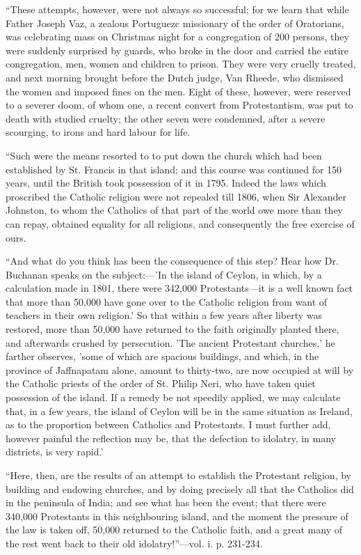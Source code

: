 ``These
attempts, however, were not always so successful; for we learn that
while Father Joseph Vaz, a zealous Portuguezc missionary of the order of
Oratorians, was celebrating mass on Christmas night for a congregation
of 200 persons, they were suddenly surprised by guards, who broke in the
door and carried the entire congregation, men, women and children to
prison. They were very cruelly treated, and next morning brought before
the Dutch judge, Van Rheede, who dismissed the women and imposed fines
on the men. Eight of these, however, were reserved to a severer doom, of
whom one, a recent convert from Protestantism, was put to death with
studied cruelty; the other seven were condemned, after a severe
scourging, to irons and hard labour for life.

``Such
were the means resorted to to put down the church which had been
established by St. Francis in that island; and this course was continued
for 150 years, until the British took possession of it in 1795. Indeed
the laws which proscribed the Catholic religion were not repealed till
1806, when Sir Alexander Johnston, to whom the Catholics of that part of
the world owe more than they can repay, obtained equality for all
religions, and consequently the free exercise of ours.

``And
what do you think has been the consequence of this step? Hear how Dr.
Buchanan speaks on the subject:—'In the island of Ceylon, in which, by
a calculation made in 1801, there were 342,000 Protestants—it is a
well known fact that more than 50,000 have gone over
to the Catholic religion from want of teachers in their own religion.'
So that within a few years after liberty was restored, more than 50,000
have returned to the faith originally planted there, and afterwards
crushed by persecution. 'The ancient Protestant churches,' he farther
observes, 'some of which are spacious buildings, and which, in the
province of Jaffnapatam alone, amount to thirty-two, are now occupied at
will by the Catholic priests of the order of St. Philip Neri, who have
taken quiet possession of the island. If a remedy be not speedily
applied, we may calculate that, in a few years, the island of Ceylon
will be in the same situation as Ireland, as to the proportion between
Catholics and Protestants. I must further add, however painful the
reflection may be, that the defection to idolatry, in many districts, is
very rapid.'

``Here,
then, are the results of an attempt to establish the Protestant
religion, by building and endowing churches, and by doing precisely all
that the Catholics did in the peninsula of India; and see what has been
the event; that there were 340,000 Protestants in this neighbouring
island, and the moment the pressure of the law is taken off, 50,000
returned to the Catholic faith, and a great many of the rest went back
to their old idolatry!''—vol. i. p. 231-234.

